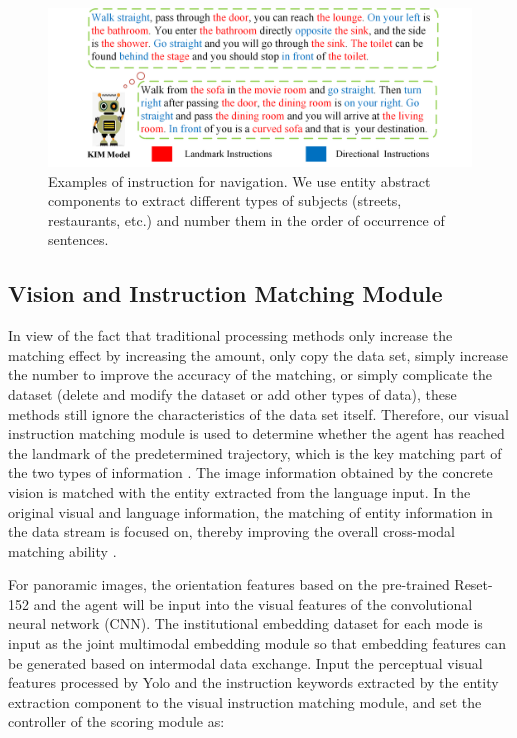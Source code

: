 \begin{figure}[h]
	\centering
	\includegraphics[scale=1]{image05.png}
	\caption{Examples of instruction for navigation. We use entity abstract components to extract different types of subjects (streets, restaurants, etc.) and number them in the order of occurrence of sentences.}
	\label{image05}
\end{figure}
\vspace{-2em}
\subsection{Vision and Instruction Matching Module}
	
In view of the fact that traditional processing methods only increase the matching effect by increasing the amount, only copy the data set, simply increase the number to improve the accuracy of the matching, or simply complicate the dataset (delete and modify the dataset or add other types of data), these methods still ignore the characteristics of the data set itself. Therefore, our visual instruction matching module is used to determine whether the agent has reached the landmark of the predetermined trajectory, which is the key matching part of the two types of information \cite{vasudevan2021talk2nav}. The image information obtained by the concrete vision is matched with the entity extracted from the language input. In the original visual and language information, the matching of entity information in the data stream is focused on, thereby improving the overall cross-modal matching ability \cite{zhao2021evaluation}.
	
For panoramic images, the orientation features based on the pre-trained Reset-152 and the agent will be input into the visual features of the convolutional neural network (CNN). The institutional embedding dataset for each mode is input as the joint multimodal embedding module so that embedding features can be generated based on intermodal data exchange. Input the perceptual visual features processed by Yolo and the instruction keywords extracted by the entity extraction component to the visual instruction matching module, and set the controller of the scoring module as:

